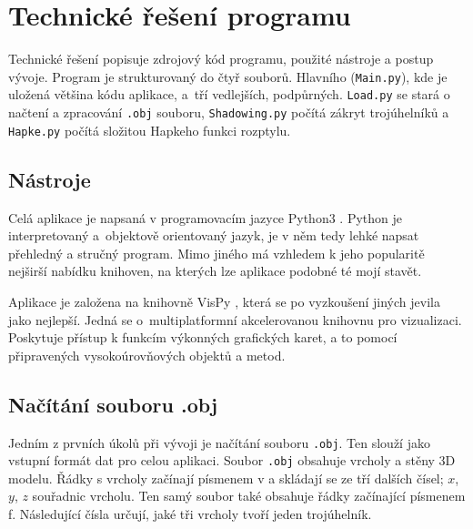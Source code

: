 \documentclass[11pt]{article}
\begin{document}

\newpage
\clearpage
\section{Technické řešení programu}

Technické řešení popisuje zdrojový kód programu, použité nástroje a postup vývoje. Program je strukturovaný do čtyř souborů. Hlavního (\verb|Main.py|), kde je uložená většina kódu aplikace, a~tří vedlejších, podpůrných. \verb|Load.py| se stará o načtení a zpracování \verb|.obj| souboru, \verb|Shadowing.py| počítá zákryt trojúhelníků a \verb|Hapke.py| počítá složitou Hapkeho funkci rozptylu. 


\subsection{Nástroje}

Celá aplikace je napsaná v programovacím jazyce Python3 \cite{python}.
Python je interpretovaný a~objektově orientovaný jazyk, je v něm tedy lehké napsat přehledný a stručný program.
Mimo jiného má vzhledem k jeho popularitě nejširší nabídku knihoven, na kterých lze aplikace podobné té mojí stavět. 

Aplikace je založena na knihovně VisPy \cite{vispy}, která se po vyzkoušení jiných jevila jako nejlepší. Jedná se o~multiplatformní akcelerovanou knihovnu pro vizualizaci. Poskytuje přístup k funkcím výkonných grafických karet, a to pomocí připravených vysokoúrovňových objektů a metod.



\subsection{Načítání souboru .obj}

Jedním z prvních úkolů při vývoji je načítání souboru \verb|.obj|. Ten slouží jako vstupní formát dat pro celou aplikaci. Soubor \verb|.obj| obsahuje vrcholy a stěny 3D modelu. Řádky s vrcholy začínají písmenem v a skládají se ze tří dalších čísel; $x$, $y$, $z$ souřadnic vrcholu. Ten samý soubor také obsahuje řádky začínající písmenem f. Následující čísla určují, jaké tři vrcholy tvoří jeden trojúhelník.
\end{document}
